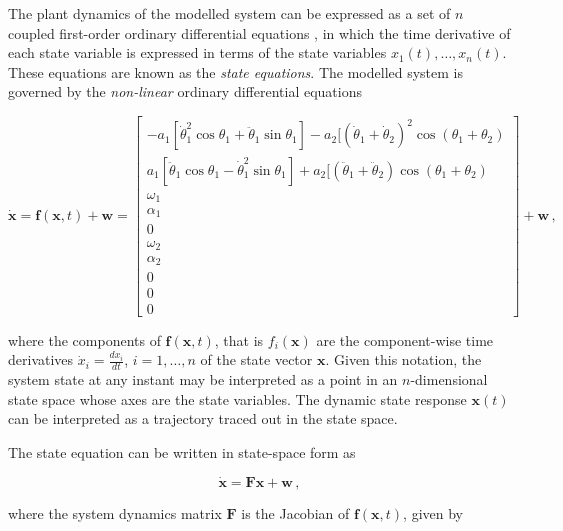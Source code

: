 The plant dynamics of the modelled system can be expressed as a set of $n$ coupled first-order ordinary differential equations \cite{rowell2002state}, in which the time derivative of each state variable is expressed in terms of the state variables $x_1(t), \dots, x_n(t)$. These equations are known as the \emph{state equations}. The modelled system is governed by the \emph{non-linear} ordinary differential equations

\begin{equation} \label{eq:state_vector_derivative}
  \dot{\mathbf{x}} = \mathbf{f}(\mathbf{x}, t) + \mathbf{w} = \left[\begin{smallmatrix}
  -a_1 [\dot{\theta}^2_1 \cos \theta_1 + \ddot{\theta}_1 \sin \theta_1] - a_2 [(\dot{\theta}_1 + \dot{\theta}_2)^2 \cos(\theta_1 + \theta_2) \\
  a_1 [\ddot{\theta}_1 \cos \theta_1 - \dot{\theta}^2_1 \sin \theta_1] + a_2 [(\ddot{\theta}_1 + \ddot{\theta}_2) \cos(\theta_1 + \theta_2) \\ \omega_1 \\ \alpha_1 \\ 0 \\ \omega_2 \\ \alpha_2 \\ 0 \\ 0 \\ 0
  \end{smallmatrix}\right] + \mathbf{w}\,,
\end{equation}

\noindent
where the components of $\mathbf{f}(\mathbf{x},t)$, that is $f_i(\mathbf{x})$ are the component-wise time derivatives $\dot{x}_i = \frac{dx_i}{dt}$, $i = 1, \dots, n$ of the state vector $\mathbf{x}$. Given this notation, the system state at any instant may be interpreted as a point in an $n$-dimensional state space whose axes are the state variables. The dynamic state response $\mathbf{x}(t)$ can be interpreted as a trajectory traced out in the state space.

The state equation can be written in state-space form as 

\begin{equation}
  \dot{\mathbf{x}} = \mathbf{F} \mathbf{x} + \mathbf{w}\,,
\end{equation}

\noindent
where the system dynamics matrix $\mathbf{F}$ is the Jacobian of $\mathbf{f}(\mathbf{x},t)$, given by

